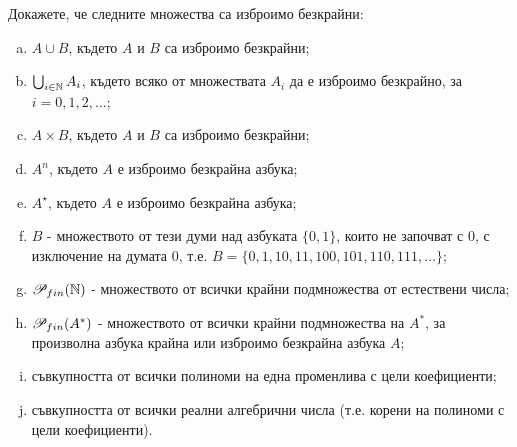 \begin{problem}
  Докажете, че следните множества са изброимо безкрайни:
  \begin{enumerate}[a)]
  \item 
    $A \cup B$, където $A$ и $B$ са изброимо безкрайни;
  \item
    $\bigcup_{i\in\mathbb{N}} A_i$, където всяко от множествата $A_i$ да е изброимо безкрайно, за $i = 0,1,2,\dots$;
  \item
    $A \times B$, където $A$ и $B$ са изброимо безкрайни;
  \item
    $A^n$, където $A$ е изброимо безкрайна азбука;
  \item
    $A^\star$, където $A$ е изброимо безкрайна азбука;
  \item
    $B$ - множеството от тези думи над азбуката $\{0,1\}$, които не започват с $0$, с изключение на 
    думата $0$, т.е. $B = \{0, 1, 10, 11, 100, 101, 110, 111, \dots\}$;
  \item
    $\mathscr{P}_{fin}(\mathbb{N})$ - множеството от всички крайни подмножества от естествени числа;
  \item
    $\mathscr{P}_{fin}(A^*)$ - множеството от всички крайни подмножества на $A^*$, за произволна азбука 
    крайна или изброимо безкрайна азбука $A$;
  \item
    съвкупността от всички полиноми на една променлива с цели коефициенти;
  \item
    съвкупността от всички реални алгебрични числа (т.е. корени на полиноми с цели коефициенти).
  \end{enumerate}
\end{problem}
